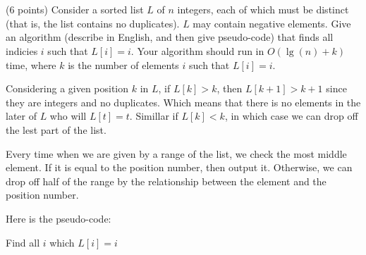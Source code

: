 \documentclass[paper=a4, fontsize=11pt]{scrartcl} %
\begin{document}
\maketitle %

\section{}

\begin{fancyquotes}
  (6 points) Consider a sorted list $L$ of $n$ integers, each of which
  must be distinct (that is, the list contains no duplicates). $L$ may
  contain negative elements. Give an algorithm (describe in English,
  and then give pseudo-code) that finds all indicies $i$ such that
  $L[i] = i$. Your algorithm should run in $O(\lg(n) + k)$ time, where
  $k$ is the number of elements $i$ such that $L[i] = i$.
\end{fancyquotes}

Considering a given position $k$ in $L$, if $L[k]>k$, then
$L[k+1]>k+1$ since they are integers and no duplicates. Which means
that there is no elements in the later of $L$ who will $L[t] = t$.
Simillar if $L[k]<k$, in which case we can drop off the lest part of
the list.

Every time when we are given by a range of the list, we check the most
middle element. If it is equal to the position number, then output
it. Otherwise, we can drop off half of the range by the relationship
between the element and the position number.

Here is the pseudo-code:

\begin{algorithm}[H]
  \caption{Find all $i$ which $L[i]=i$}
\end{algorithm}

\pagebreak

\end{document}
